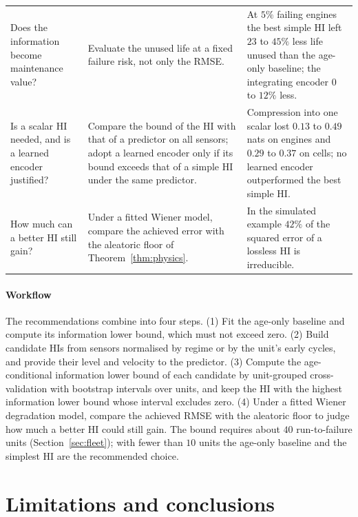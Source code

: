 \documentclass[preprint,12pt]{elsarticle}
\theoremstyle{definition}
\begin{document}
\begin{table}[!t]
\begin{tabular}{>{\raggedright\arraybackslash}p{2.9cm}p{5.6cm}p{6.5cm}}
Does the information become maintenance value? & Evaluate the unused life at a fixed failure risk, not only the RMSE. & At $5\%$ failing engines the best simple HI left $23$ to $45\%$ less life unused than the age-only baseline; the integrating encoder $0$ to $12\%$ less. \\
Is a scalar HI needed, and is a learned encoder justified? & Compare the bound of the HI with that of a predictor on all sensors; adopt a learned encoder only if its bound exceeds that of a simple HI under the same predictor. & Compression into one scalar lost $0.13$ to $0.49$ nats on engines and $0.29$ to $0.37$ on cells; no learned encoder outperformed the best simple HI. \\
How much can a better HI still gain? & Under a fitted Wiener model, compare the achieved error with the aleatoric floor of Theorem~\ref{thm:physics}. & In the simulated example $42\%$ of the squared error of a lossless HI is irreducible. \\
\hline
\end{tabular}
\end{table}

\paragraph{Workflow} The recommendations combine into four steps. (1) Fit the age-only baseline and compute its information lower bound, which must not exceed zero. (2) Build candidate HIs from sensors normalised by regime or by the unit's early cycles, and provide their level and velocity to the predictor. (3) Compute the age-conditional information lower bound of each candidate by unit-grouped cross-validation with bootstrap intervals over units, and keep the HI with the highest information lower bound whose interval excludes zero. (4) Under a fitted Wiener degradation model, compare the achieved RMSE with the aleatoric floor to judge how much a better HI could still gain. The bound requires about $40$ run-to-failure units (Section~\ref{sec:fleet}); with fewer than $10$ units the age-only baseline and the simplest HI are the recommended choice.

\section{Limitations and conclusions}
\label{sec:disc}
\end{document}
